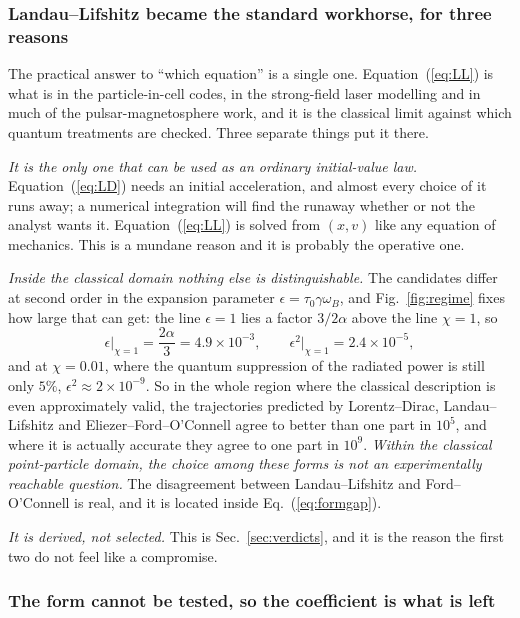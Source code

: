 \documentclass[preprint]{aastex701}
\newcommand{\taunought}{\tau_0}
\begin{document}
\subsubsection{Landau--Lifshitz became the standard workhorse, for three reasons}
\label{sec:whyLL}

The practical answer to ``which equation'' is a single one.
Equation~(\ref{eq:LL}) is what is in the particle-in-cell codes, in the
strong-field laser modelling and in much of the pulsar-magnetosphere work, and
it is the classical limit against which quantum treatments are checked. Three
separate things put it there.

\emph{It is the only one that can be used as an ordinary initial-value law.}
Equation~(\ref{eq:LD}) needs an initial acceleration, and almost every choice of
it runs away; a numerical integration will find the runaway whether or not the
analyst wants it.
Equation~(\ref{eq:LL}) is solved from $(x,v)$ like any equation of mechanics.
This is a mundane reason and it is probably the operative one.

\emph{Inside the classical domain nothing else is distinguishable.} The
candidates differ at second order in the expansion parameter
$\epsilon = \taunought\gamma\omega_B$, and Fig.~\ref{fig:regime} fixes how
large that can get: the line $\epsilon=1$ lies a factor $3/2\alpha$ above the
line $\chi=1$, so
\begin{equation}
\epsilon\big|_{\chi=1} = \frac{2\alpha}{3} = 4.9\times10^{-3},
\qquad
\epsilon^2\big|_{\chi=1} = 2.4\times10^{-5},
\label{eq:formgap}
\end{equation}
and at $\chi=0.01$, where the quantum suppression of the radiated power is
still only $5\%$, $\epsilon^2\approx2\times10^{-9}$. So in the
whole region where the classical description is even approximately valid, the
trajectories predicted by Lorentz--Dirac, Landau--Lifshitz and
Eliezer--Ford--O'Connell agree to better than one part in $10^{5}$, and where it
is actually accurate they agree to one part in $10^{9}$. \emph{Within the
classical point-particle domain, the choice among these forms is not an
experimentally reachable question.} The disagreement between Landau--Lifshitz
and Ford--O'Connell is real, and it is located inside Eq.~(\ref{eq:formgap}).

\emph{It is derived, not selected.} This is Sec.~\ref{sec:verdicts}, and it is
the reason the first two do not feel like a compromise.

\subsubsection{The form cannot be tested, so the coefficient is what is left}
\label{sec:whycoefficient}
\end{document}
